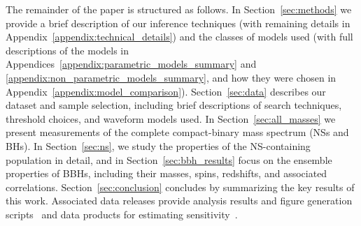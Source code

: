 The remainder of the paper is structured as follows. In Section~\ref{sec:methods} we provide a brief description of our inference techniques (with remaining details in  Appendix~\ref{appendix:technical_details}) and the classes of models used (with full descriptions of the models in Appendices~\ref{appendix:parametric_models_summary} and \ref{appendix:non_parametric_models_summary}, and how they were chosen in Appendix~\ref{appendix:model_comparison}).  Section~\ref{sec:data} describes our dataset and sample selection, including brief descriptions of search techniques, threshold choices, and waveform models used.  In Section~\ref{sec:all_masses} we present measurements of the complete compact-binary mass spectrum (\acp{NS} and \acp{BH}).  In Section~\ref{sec:ns}, we study the properties of the \ac{NS}-containing population in detail, and in Section~\ref{sec:bbh_results} focus on the ensemble properties of \acp{BBH}, including their masses, spins, redshifts, and associated correlations. Section~\ref{sec:conclusion} concludes by summarizing the key results of this work.  Associated data releases provide analysis results and figure generation scripts~\citep{lvk_pop_data_release} and data products for estimating sensitivity~\citep{essick_2025_16740117,essick_2025_16740128}.